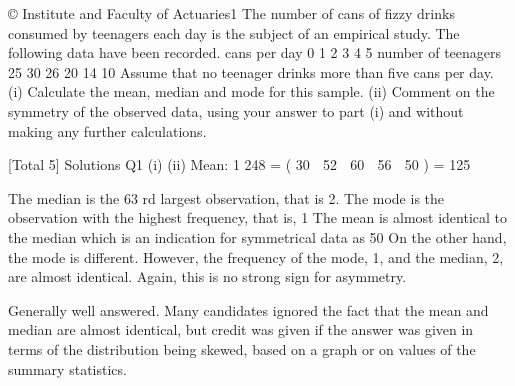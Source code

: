 \documentclass[a4paper,12pt]{article}
\begin{document}
© Institute and Faculty of Actuaries1
The number of cans of fizzy drinks consumed by teenagers each day is the subject of
an empirical study. The following data have been recorded.
cans per day 0 1 2 3 4 5
number of teenagers 25 30 26 20 14 10
Assume that no teenager drinks more than five cans per day.
(i) Calculate the mean, median and mode for this sample.
(ii) Comment on the symmetry of the observed data, using your answer to part (i)
and without making any further calculations.

[Total 5]
Solutions
Q1
(i)
(ii)
Mean:
1
248
\;=
( 30  52  60  56  50 ) \;=
125

The median is the 63 rd largest observation, that is 2. 
The mode is the observation with the highest frequency, that is, 1 
The mean is almost identical to the median which is an indication for
symmetrical data as 50%
On the other hand, the mode is different. However, the frequency of the mode,
1, and the median, 2, are almost identical. Again, this is no strong sign for
asymmetry.

Generally well answered. Many candidates ignored the fact that the
mean and median are almost identical, but credit was given if the
answer was given in terms of the distribution being skewed, based on a
graph or on values of the summary statistics.
\end{document}
